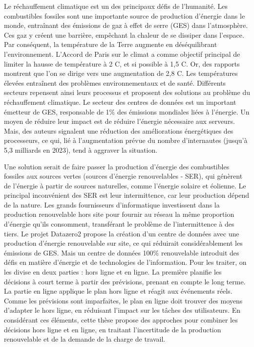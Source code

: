 Le réchauffement climatique est un des principaux défis de l'humanité. Les combustibles fossiles sont une importante source de production d'énergie dans le monde, entraînant des émissions de gaz à effet de serre (GES) dans l'atmosphère. Ces gaz y créent une barrière, empêchant la chaleur de se dissiper dans l'espace. Par conséquent, la température de la Terre augmente en déséquilibrant l'environnement. L'Accord de Paris sur le climat a comme objectif principal de limiter la hausse de température à 2 \degree C, et si possible à 1,5 \degree C. Or, des rapports montrent que l'on se dirige vers une augmentation de 2,8 \degree C. Les températures élevées entraînent des problèmes environnementaux et de santé. Différents secteurs repensent ainsi leurs processus et proposent des solutions au problème du réchauffement climatique. Le secteur des centres de données est un important émetteur de GES, responsable de 1\% des émissions mondiales liées à l'énergie. Un moyen de réduire leur impact est de réduire l'énergie nécessaire aux serveurs. Mais, des auteurs signalent une réduction des améliorations énergétiques des processeurs, ce qui, lié à l'augmentation prévue du nombre d'internautes (jusqu'à 5,3 milliards en 2023), tend à aggraver la situation. 

Une solution serait de faire passer la production d'énergie des combustibles fossiles aux sources vertes (sources d'énergie renouvelables - SER), qui génèrent de l'énergie à partir de sources naturelles, comme l'énergie solaire et éolienne. Le principal inconvénient des SER est leur intermittence, car leur production dépend de la nature. Les grands fournisseurs d'informatique investissent dans la production renouvelable hors site pour fournir au réseau la même proportion d'énergie qu'ils consomment, transférant le problème de l'intermittence à des tiers. Le projet Datazero2 propose la création d'un centre de données avec une production d'énergie renouvelable sur site, ce qui réduirait considérablement les émissions de GES. Mais un centre de données 100\% renouvelable introduit des défis en matière d'énergie et de technologies de l'information. Pour les traiter, on les divise en deux parties : hors ligne et en ligne. La première planifie les décisions à court terme à partir des prévisions, prenant en compte le long terme. La partie en ligne applique le plan hors ligne et réagit aux événements réels. Comme les prévisions sont imparfaites, le plan en ligne doit trouver des moyens d'adapter le hors ligne, en réduisant l'impact sur les tâches des utilisateurs. En considérant ces éléments, cette thèse propose des approches pour combiner les décisions hors ligne et en ligne, en traitant l'incertitude de la production renouvelable et de la demande de la charge de travail. 


